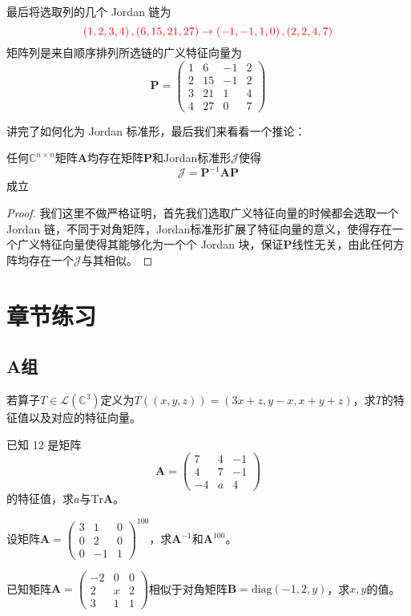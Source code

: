 \begin{example}
最后将选取列的几个 Jordan 链为$$\textcolor{red}{\left( 1,2,3,4 \right),\left( 6,15,21,27 \right) \rightarrow \left( -1,-1,1,0 \right),\left( 2,2,4,7 \right)}$$矩阵列是来自顺序排列所选链的广义特征向量为$$\mathbf{P}=\begin{pmatrix}
	1 & 6 & -1 & 2\\
	2 & 15 & -1 & 2\\
	3 & 21 & 1 & 4\\
	4 & 27 & 0 & 7
	\end{pmatrix}$$
\end{example}

讲完了如何化为 Jordan 标准形，最后我们来看看一个推论：

\begin{corollary}
	任何$\mathbb{C}^{n\times n}$矩阵$\mathbf{A}$均存在矩阵$\mathbf{P}$和Jordan标准形$\mathscr{J}$使得$$\mathscr{J}=\mathbf{P}^{-1}\mathbf{A}\mathbf{P}$$成立
\end{corollary}

\begin{proof}
	我们这里不做严格证明，首先我们选取广义特征向量的时候都会选取一个 Jordan 链，不同于对角矩阵，Jordan标准形扩展了特征向量的意义，使得存在一个广义特征向量使得其能够化为一个个 Jordan 块，保证$\mathbf{P}$线性无关，由此任何方阵均存在一个$\mathscr{J}$与其相似。
\end{proof}

\section{章节练习}

\subsection{A组}

\begin{reidai}
	若算子$T\in \mathcal{L}(\mathbb{C}^3)$定义为$T((x,y,z))=(3x+z,y-x,x+y+z)$，求$T$的特征值以及对应的特征向量。
\end{reidai}

\begin{reidai}
	已知 12 是矩阵$$\mathbf{A}=\begin{pmatrix}
	7 & 4 & -1\\
	4 & 7 & -1\\
	-4 & a & 4
	\end{pmatrix}$$的特征值，求$a$与$\text{Tr}\mathbf{A}$。
\end{reidai}

\begin{reidai}
	设矩阵$\mathbf{A}=\begin{pmatrix}
		3 & 1 & 0 \\
		0 & 2 & 0 \\
		0 & -1 & 1
		\end{pmatrix}^{100}$，求$\mathbf{A}^{-1}$和$\mathbf{A}^{100}$。
\end{reidai}

\begin{reidai}
	已知矩阵$\mathbf{A}=\begin{pmatrix}
	-2 & 0 & 0 \\
	2 & x & 2 \\
	3 & 1 & 1
	\end{pmatrix}$相似于对角矩阵$\mathbf{B}=\text{diag}\left( -1,2,y \right)$，求$x,y$的值。
\end{reidai}